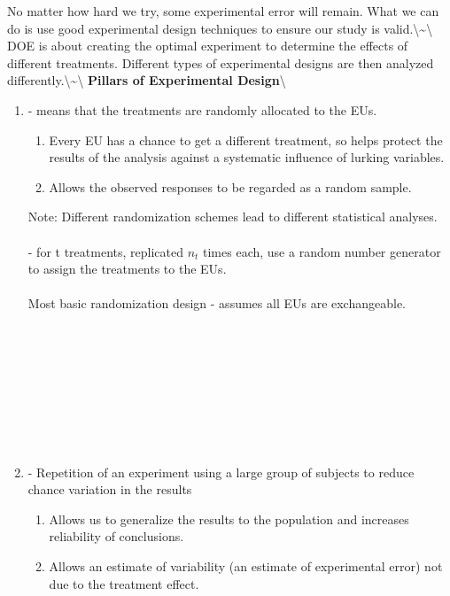 \documentclass[]{book}
\begin{document}
\newpage

No matter how hard we try, some experimental error will remain. What we
can do is use good experimental design techniques to ensure our study is
valid.\textbackslash{}\textasciitilde{}\textbackslash{} DOE is about
creating the optimal experiment to determine the effects of different
treatments. Different types of experimental designs are then analyzed
differently.\textbackslash{}\textasciitilde{}\textbackslash{}
\textbf{Pillars of Experimental Design}\textbackslash{}

\begin{enumerate}
        \item \underbar{~~~~~~~~~~~~~~~~~~~~~~~~~~~~~} - means that the treatments are randomly allocated to the EUs.
            \begin{enumerate}
                \item Every EU has a chance to get a different treatment, so helps protect the results of the analysis against a systematic influence of lurking variables.  
                \item Allows the observed responses to be regarded as a random sample.
            \end{enumerate}
        Note: Different randomization schemes lead to different statistical analyses.\\~\\
        \underbar{~~~~~~~~~~~~~~~~~~~~~~~~~~~~~~~~~~~~~~~~~~~~~~~~} - for t treatments, replicated $n_t$ times each, use a random number generator to assign the treatments to the EUs.\\~\\
        Most basic randomization design - assumes all EUs are exchangeable.\\~\\~\\~\\~\\~\\~\\~\\~\\
        \item \underbar{~~~~~~~~~~~~~~~~~~~~~~~~~~~~~} - Repetition of an experiment using a large group of subjects to reduce chance variation in the results
\begin{enumerate}
                \item Allows us to generalize the results to the population and increases reliability of conclusions. 
                \item Allows an estimate of variability (an estimate of experimental error) not due to the treatment effect.

\end{enumerate}
\end{enumerate}
\end{document}
